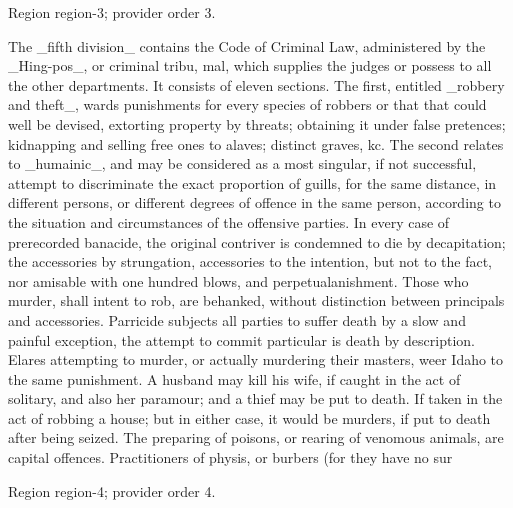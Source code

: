 \documentclass[11pt]{article}
\begin{document}
{\scriptsize\color{gray} Region region-3; provider order 3.\par}
\medskip

The \_fifth division\_ contains the Code of Criminal Law, administered by the \_Hing-pos\_, or criminal tribu, mal, which supplies the judges or possess to all the other departments. It consists of eleven sections. The first, entitled \_robbery and theft\_, wards punishments for every species of robbers or that that could well be devised, extorting property by threats; obtaining it under false pretences; kidnapping and selling free ones to alaves; distinct graves, kc. The second relates to \_humainic\_, and may be considered as a most singular, if not successful, attempt to discriminate the exact proportion of guills, for the same distance, in different persons, or different degrees of offence in the same person, according to the situation and circumstances of the offensive parties. In every case of prerecorded banacide, the original contriver is condemned to die by decapitation; the accessories by strungation, accessories to the intention, but not to the fact, nor amisable with one hundred blows, and perpetualanishment. Those who murder, shall intent to rob, are behanked, without distinction between principals and accessories. Parricide subjects all parties to suffer death by a slow and painful exception, the attempt to commit particular is death by description. Elares attempting to murder, or actually murdering their masters, weer Idaho to the same punishment. A husband may kill his wife, if caught in the act of solitary, and also her paramour; and a thief may be put to death. If taken in the act of robbing a house; but in either case, it would be murders, if put to death after being seized. The preparing of poisons, or rearing of venomous animals, are capital offences. Practitioners of physis, or burbers (for they have no sur
\par

{\scriptsize\color{gray} Region region-4; provider order 4.\par}
\medskip
\end{document}
